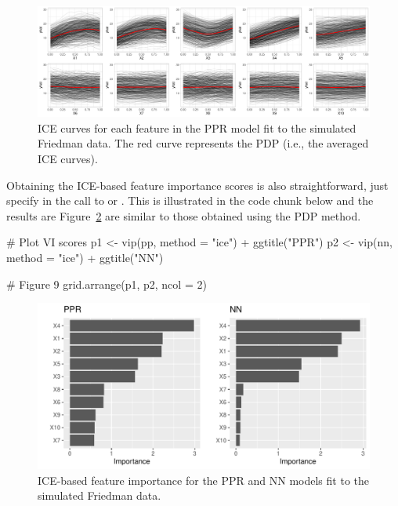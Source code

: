 
\begin{figure}[!htb]
  \centering 
  \includegraphics[width=1\linewidth]{figures/ice-ppr} 
  \caption{ICE curves for each feature in the PPR model fit to the simulated Friedman data. The red curve represents the PDP (i.e., the averaged ICE curves).}
  \label{fig:ice-ppr}
\end{figure}

Obtaining the ICE-based feature importance scores is also straightforward, just specify  in the call to  or . This is illustrated in the code chunk below and the results are Figure~\ref{fig:vip-ice-ppr-nn} are similar to those obtained using the PDP method.

\begin{example}
# Plot VI scores
p1 <- vip(pp, method = "ice") + ggtitle("PPR")
p2 <- vip(nn, method = "ice") + ggtitle("NN")

# Figure 9
grid.arrange(p1, p2, ncol = 2)
\end{example}

\begin{figure}[!htb]
  \centering 
  \includegraphics[width=1\linewidth]{figures/vip-ice-ppr-nn} 
  \caption{ICE-based feature importance for the PPR and NN models fit to the simulated Friedman data.}
  \label{fig:vip-ice-ppr-nn}
\end{figure}

